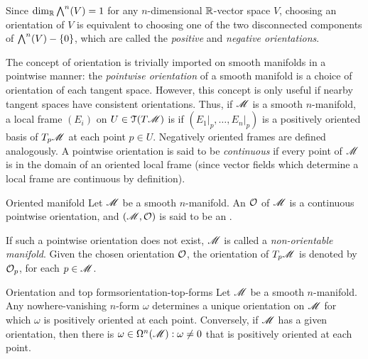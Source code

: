 Since $ \dim_{\mathbb{R}} {\bigwedge}^{n}(V) = 1 $ for any $ n $-dimensional $ \mathbb{R} $-vector space $ V $, choosing an orientation of $ V $ is equivalent to choosing one of the two disconnected components of $ {\bigwedge}^{n}(V) - \{0\} $, which are called the \emph{positive} and \emph{negative orientations}.

The concept of orientation is trivially imported on smooth manifolds in a pointwise manner: the \emph{pointwise orientation} of a smooth manifold is a choice of orientation of each tangent space. However, this concept is only useful if nearby tangent spaces have consistent orientations. Thus, if $ \mathscr{M} $ is a smooth $ n $-manifold, a local frame $ (E_i) $ on $ U \in \EuScript{T}(T\mathscr{M}) $ is  if $ (E_1 \vert_p , \dots , E_n \vert_p) $ is a positively oriented basis of $ T_p\mathscr{M} $ at each point $ p \in U $. Negatively oriented frames are defined analogously. A pointwise orientation is said to be \emph{continuous} if every point of $ \mathscr{M} $ is in the domain of an oriented local frame (since vector fields which determine a local frame are continuous by definition).

\begin{definition}{Oriented manifold}{}
  Let $ \mathscr{M} $ be a smooth $ n $-manifold. An  $ \mathcal{O} $ of $ \mathscr{M} $ is a continuous pointwise orientation, and $ (\mathscr{M},\mathcal{O}) $ is said to be an .
\end{definition}

If such a pointwise orientation does not exist, $ \mathscr{M} $ is called a \emph{non-orientable manifold}. Given the chosen orientation $ \mathcal{O} $, the orientation of $ T_p\mathscr{M} $ is denoted by $ \mathcal{O}_p $, for each $ p \in \mathscr{M} $.

\begin{proposition}{Orientation and top forms}{orientation-top-forms}
  Let $ \mathscr{M} $ be a smooth $ n $-manifold. Any nowhere-vanishing $ n $-form $ \omega $ determines a unique orientation on $ \mathscr{M} $ for which $ \omega $ is positively oriented at each point. Conversely, if $ \mathscr{M} $ has a given orientation, then there is $ \omega \in \Omega^{n}(\mathscr{M}) : \omega \neq 0 $ that is positively oriented at each point.
\end{proposition}

